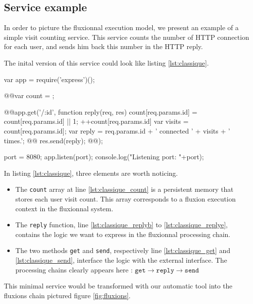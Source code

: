 
\subsection{Service example}

In order to picture the fluxionnal execution model, we present an example of a simple visit counting service.
This service counts the number of HTTP connection for each user, and sends him back this number in the HTTP reply.

The inital version of this service could look like listing \ref{lst:classique}.

\begin{code}[Javascript, caption={Initial service},label={lst:classique}]
var app = require('express')();

@\label{lst:classique_count}@var count = {};

@\label{lst:classique_get}\label{lst:classique_replyb}@app.get('/:id', function reply(req, res){
  count[req.params.id] = count[req.params.id]  || 1;
  ++count[req.params.id]
  var visits = count[req.params.id];
  var reply = req.params.id + ' connected ' + visits + ' times.';
@\label{lst:classique_send}@  res.send(reply);
@\label{lst:classique_replye}@});

port = 8080;
app.listen(port);
console.log("Listening port: "+port);
\end{code}

In listing \ref{lst:classique}, three elements are worth noticing.

\begin{itemize}
  \item The \texttt{count} array at line \ref{lst:classique_count} is a persistent memory that stores each user visit count.
  This array corresponds to a fluxion execution context in the fluxionnal system.
  \item The \texttt{reply} function, line \ref{lst:classique_replyb} to \ref{lst:classique_replye}, contains the logic we want to express in the fluxionnal processing chain.
  \item The two methods \texttt{get} and \texttt{send}, respectively line \ref{lst:classique_get} and \ref{lst:classique_send}, interface the logic with the external interface.
  The processing chains clearly appears here : $\texttt{get} \to \texttt{reply} \to \texttt{send}$
\end{itemize}

This minimal service would be transformed with our automatic tool into the fluxions chain pictured figure \ref{fig:fluxions}.

